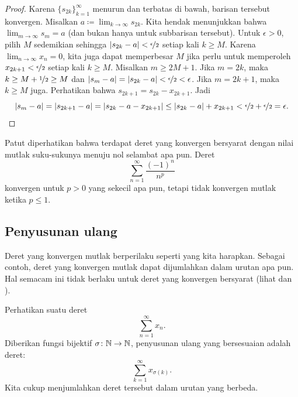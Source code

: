 \begin{proof}
Karena $\{ s_{2k} \}_{k=1}^\infty$ menurun dan terbatas di bawah, barisan tersebut konvergen.
Misalkan $a \coloneqq \lim_{k\to\infty} s_{2k}$.
Kita hendak menunjukkan bahwa $\lim_{m\to\infty} s_m = a$ (dan bukan hanya untuk subbarisan tersebut).
Untuk $\epsilon > 0$, pilih $M$ sedemikian sehingga $\lvert {s_{2k}-a} \rvert <
\nicefrac{\epsilon}{2}$ setiap kali $k \geq M$.
Karena $\lim_{n\to\infty} x_n = 0$, kita juga dapat
memperbesar $M$ jika perlu
untuk memperoleh
$x_{2k+1} < \nicefrac{\epsilon}{2}$ setiap kali $k \geq M$.  
Misalkan $m \geq 2M+1$.  Jika $m=2k$, maka $k \geq M+\nicefrac{1}{2} \geq M$ dan
$\lvert {s_{m}-a} \rvert=\lvert {s_{2k}-a} \rvert < \nicefrac{\epsilon}{2} < \epsilon$.
Jika $m=2k+1$, maka $k \geq M$ juga.  Perhatikan bahwa
$s_{2k+1} = s_{2k} - x_{2k+1}$.
Jadi
\begin{equation*}
\lvert {s_{m}-a} \rvert = 
\lvert {s_{2k+1}-a} \rvert = 
\lvert {s_{2k}-a - x_{2k+1}} \rvert \leq
\lvert {s_{2k}-a} \rvert + x_{2k+1} < 
\nicefrac{\epsilon}{2}+ \nicefrac{\epsilon}{2} = \epsilon .  \qedhere
\end{equation*}
\end{proof}

Patut diperhatikan bahwa terdapat deret yang konvergen bersyarat
dengan nilai mutlak suku-sukunya menuju nol selambat apa pun.
Deret
\begin{equation*}
\sum_{n=1}^\infty \frac{{(-1)}^n}{n^p}
\end{equation*}
konvergen untuk $p > 0$ yang sekecil apa pun, tetapi tidak konvergen
mutlak ketika $p \leq 1$.

\subsection{Penyusunan ulang}

Deret yang konvergen mutlak berperilaku seperti yang kita harapkan.  Sebagai contoh,
deret yang konvergen mutlak dapat dijumlahkan dalam urutan apa pun.  Hal semacam ini
tidak berlaku untuk deret yang konvergen bersyarat
(lihat 
dan ).

Perhatikan suatu deret
\begin{equation*}
\sum_{n=1}^\infty x_n .
\end{equation*}
Diberikan fungsi bijektif $\sigma \colon {\mathbb{N}} \to {\mathbb{N}}$, penyusunan
ulang yang bersesuaian adalah
deret:
\begin{equation*}
\sum_{k=1}^\infty x_{\sigma(k)} .
\end{equation*}
Kita cukup menjumlahkan deret tersebut dalam urutan yang berbeda.

